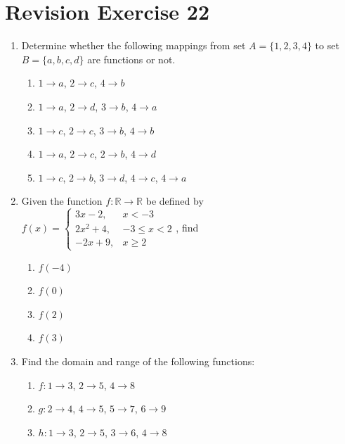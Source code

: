 \documentclass[12pt]{report}
\begin{document}
\newpage

\section*{Revision Exercise 22}

\setlength{\columnseprule}{1pt}
\setlength{\columnsep}{24pt}

\begin{multicols}{2}
  \begin{enumerate}
    \item Determine whether the following mappings from set $A = \{1, 2, 3, 4\}$ to set
          $B = \{a, b, c, d\}$ are functions or not.
          \begin{enumerate}
            \item $1 \to a$, $2 \to c$, $4 \to b$
            \item $1 \to a$, $2 \to d$, $3 \to b$, $4 \to a$
            \item $1 \to c$, $2 \to c$, $3 \to b$, $4 \to b$
            \item $1 \to a$, $2 \to c$, $2 \to b$, $4 \to d$
            \item $1 \to c$, $2 \to b$, $3 \to d$, $4 \to c$, $4 \to a$
          \end{enumerate}

    \item Given the function $f: \mathbb{R} \to \mathbb{R}$ be defined by $f(x) = \left\{\begin{array}{rl}
              3x - 2,   & x < -3        \\
              2x^2 + 4, & -3 \leq x < 2 \\
              -2x + 9,  & x \geq 2
            \end{array}\right.$, find
          \begin{enumerate}
            \item $f(-4)$
            \item $f(0)$
            \item $f(2)$
            \item $f(3)$
          \end{enumerate}

    \item Find the domain and range of the following functions:
          \begin{enumerate}
            \item $f: 1 \to 3$, $2 \to 5$, $4 \to 8$
            \item $g: 2 \to 4$, $4 \to 5$, $5 \to 7$, $6 \to 9$
            \item $h: 1 \to 3$, $2 \to 5$, $3 \to 6$, $4 \to 8$
          \end{enumerate}


\end{enumerate}
\end{multicols}
\end{document}
